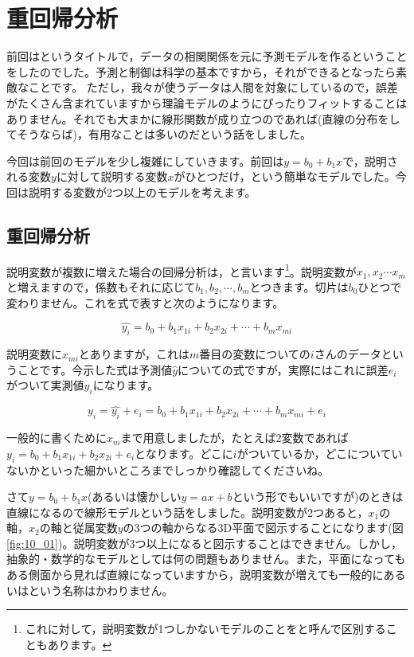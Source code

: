 \documentclass{ltjbook}
\begin{document}
\chapter{重回帰分析}
\label{m10_MultipleRegression}

前回はというタイトルで，データの相関関係を元に予測モデルを作るということをしたのでした。予測と制御は科学の基本ですから，それができるとなったら素敵なことです。
ただし，我々が使うデータは人間を対象にしているので，誤差がたくさん含まれていますから理論モデルのようにぴったりフィットすることはありません。それでも大まかに線形関数が成り立つのであれば(直線の分布をしてそうならば)，有用なことは多いのだという話をしました。

今回は前回のモデルを少し複雑にしていきます。前回は$y=b_0+b_1x$で，説明される変数$y$に対して説明する変数$x$がひとつだけ，という簡単なモデルでした。今回は説明する変数が2つ以上のモデルを考えます。

\section{重回帰分析}
説明変数が複数に増えた場合の回帰分析は，と言います\footnote{これに対して，説明変数が1つしかないモデルのことをと呼んで区別することもあります。}。説明変数が$x_1,x_2\cdots x_m$と増えますので，係数もそれに応じて$b_1,b_2,\cdots,b_m$とつきます。切片は$b_0$ひとつで変わりません。これを式で表すと次のようになります。

\[\hat{y_i}=b_0 + b_1x_{1i}+b_2x_{2i}+\cdots+b_mx_{mi}\]

説明変数に$x_{mi}$とありますが，これは$m$番目の変数についての$i$さんのデータということです。今示した式は予測値$\hat{y}$についての式ですが，実際にはこれに誤差$e_i$がついて実測値$y_i$になります。

\[ y_i = \hat{y_i} + e_i = b_0 + b_1x_{1i}+b_2x_{2i}+\cdots+b_mx_{mi} + e_i \]

一般的に書くために$x_m$まで用意しましたが，たとえば2変数であれば$y_i = b_0 + b_1x_{1i}+b_2x_{2 i}+e_i$となります。どこに$i$がついているか，どこについていないかといった細かいところまでしっかり確認してくださいね。

さて$y=b_0 + b_1 x$(あるいは懐かしい$y=ax+b$という形でもいいですが)のときは直線になるので線形モデルという話をしました。説明変数が2つあると，$x_1$の軸，$x_2$の軸と従属変数$y$の3つの軸からなる3D平面で図示することになります(図\ref{fig:10_01})。説明変数が3つ以上になると図示することはできません。しかし，抽象的・数学的なモデルとしては何の問題もありません。また，平面になってもある側面から見れば直線になっていますから，説明変数が増えても一般的にあるいはという名称はかわりません。
\end{document}
